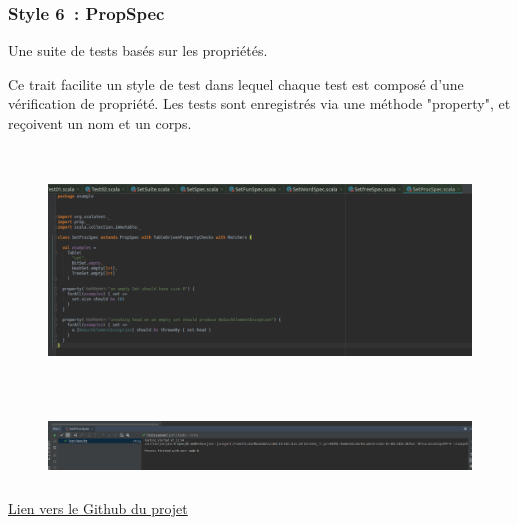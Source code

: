 \documentclass[12pt]{article}
\begin{document}

\par

\subsubsection{Style 6 : PropSpec}

\begin{justify}
Une suite de tests basés sur les propriétés.
\end{justify}\par

\begin{justify}
Ce trait facilite un style de test dans lequel chaque test est composé d'une vérification de propriété. Les tests sont enregistrés via une méthode "property", et reçoivent un nom et un corps.
\end{justify}\par




\begin{figure}[H]
	\begin{Center}
		\includegraphics[width=6.3in,height=2.55in]{./media/image36.png}
	\end{Center}
\end{figure}



\par




\begin{figure}[H]
	\begin{Center}
		\includegraphics[width=6.3in,height=0.72in]{./media/image37.png}
	\end{Center}
\end{figure}



\par

\href{https://github.com/HalimaLe/projetScalaTestUtest}{Lien vers le Github du projet}
\printbibliography
\end{document}
